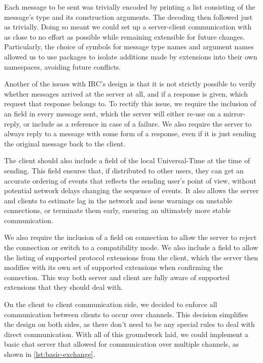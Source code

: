 \documentclass[format=sigconf]{acmart}
\begin{document}
Each message to be sent was trivially encoded by printing a list consisting of the message's type and its construction arguments. The decoding then followed just as trivially. Doing so meant we could set up a server-client communication with as close to no effort as possible while remaining extensible for future changes. Particularly, the choice of symbols for message type names and argument names allowed us to use packages to isolate additions made by extensions into their own namespaces, avoiding future conflicts.

Another of the issues with IRC's design is that it is not strictly possible to verify whether messages arrived at the server at all, and if a response is given, which request that response belongs to. To rectify this issue, we require the inclusion of an  field in every message sent, which the server will either re-use on a mirror-reply, or include as a reference in case of a failure. We also require the server to always reply to a message with some form of a response, even if it is just sending the original message back to the client.

The client should also include a  field of the local Universal-Time at the time of sending. This field ensures that, if distributed to other users, they can get an accurate ordering of events that reflects the sending user's point of view, without potential network delays changing the sequence of events. It also allows the server and clients to estimate lag in the network and issue warnings on unstable connections, or terminate them early, ensuring an ultimately more stable communication.

We also require the inclusion of a  field on connection to allow the server to reject the connection or switch to a compatibility mode. We also include a  field to allow the listing of supported protocol extensions from the client, which the server then modifies with its own set of supported extensions when confirming the connection. This way both server and client are fully aware of supported extensions that they should deal with.

On the client to client communication side, we decided to enforce all communication between clients to occur over channels. This decision simplifies the design on both sides, as there don't need to be any special rules to deal with direct communication. With all of this groundwork laid, we could implement a basic chat server that allowed for communication over multiple channels, as shown in \autoref{lst:basic-exchange}.
\end{document}
